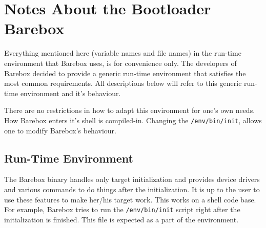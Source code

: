 %
%
%
%
%
%
%

\section{Notes About the Bootloader Barebox}	\label{sec:bareboxnotes}

Everything mentioned here (variable names and file names) in the run-time
environment that Barebox uses, is for convenience only. The developers of Barebox
decided to provide a generic run-time environment that satisfies the most
common requirements. All descriptions below will refer to this generic
run-time environment and it's behaviour.

There are no restrictions in how to adapt this environment for one's own
needs. How Barebox enters it's shell is compiled-in. Changing the
\texttt{/env/bin/init}, allows one to modify Barebox's behaviour.

%
%

\subsection{Run-Time Environment}			\label{sec:bbenv}

The Barebox binary handles only target initialization and provides device
drivers and various commands to do things after the initialization. It is up to
the user to use these features to make her/his target work. This works on a
shell code base. For example, Barebox tries to run the \texttt{/env/bin/init}
script right after the initialization is finished. This file is expected
as a part of the environment.

